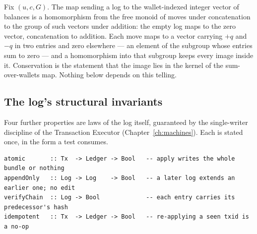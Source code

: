 \begin{secondtelling}
Fix $(u,c,G)$. The map sending a log to the wallet-indexed integer vector of
balances is a homomorphism from the free monoid of moves under concatenation to
the group of such vectors under addition: the empty log maps to the zero vector,
concatenation to addition. Each move maps to a vector carrying $+q$ and $-q$ in
two entries and zero elsewhere --- an element of the subgroup whose entries sum to
zero --- and a homomorphism into that subgroup keeps every image inside it.
Conservation is the statement that the image lies in the kernel of the
sum-over-wallets map. Nothing below depends on this telling.
\end{secondtelling}

\subsection{The log's structural invariants}

Four further properties are laws of the log itself, guaranteed by the
single-writer discipline of the Transaction Executor (Chapter~\ref{ch:machines}).
Each is stated once, in the form a test consumes.

\begin{lstlisting}
atomic       :: Tx  -> Ledger -> Bool   -- apply writes the whole bundle or nothing
appendOnly   :: Log -> Log    -> Bool   -- a later log extends an earlier one; no edit
verifyChain  :: Log -> Bool             -- each entry carries its predecessor's hash
idempotent   :: Tx  -> Ledger -> Bool   -- re-applying a seen txid is a no-op
\end{lstlisting}


